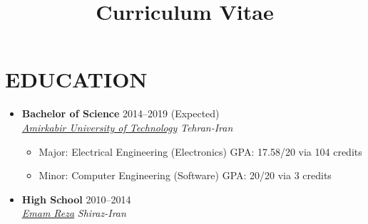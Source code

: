 \documentclass[10pt,a4paper,sans]{moderncv} %
\title{Curriculum Vitae}
\newcommand*{\authorimg}[1]{%
	\raisebox{-.3\baselineskip}{%
		\texttt{[image: \#1]}%
	}%
}
\begin{document}
	
\makecvtitle






\section{EDUCATION}

\begin{itemize}
	
	\item \textbf{Bachelor of Science} \hfill 2014--2019 (Expected) \\
	\href{http://aut.ac.ir/}{\authorimg{pictures/aut.png} \emph{Amirkabir University of Technology}} \hfill \emph{Tehran-Iran}

	\begin{itemize}
		\item Major: Electrical Engineering (Electronics) \hspace{30 pt}  GPA: 17.58/20 via 104 credits
		\item Minor: Computer Engineering (Software) \hspace{37 pt} GPA: 20/20 via 3 credits
	\end{itemize}
	
	\item \textbf{High School} \hfill 2010--2014 \\
	\href{http://emamrezaschool.com/}{\authorimg{pictures/emamreza.png} \emph{Emam Reza}} \hfill \emph{Shiraz-Iran}

\end{itemize}
\end{document}
